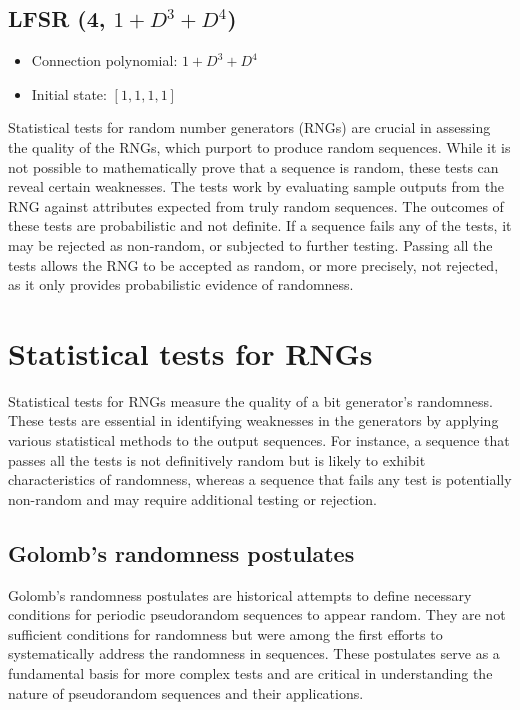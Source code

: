 \documentclass[12pt,openany]{book}
\theoremstyle{definition}
\begin{document}
\subsection*{LFSR (4, \( 1 + D^3 + D^4 \))}
\begin{itemize}
	\item Connection polynomial: \( 1 + D^3 + D^4 \)
	\item Initial state: \( [1, 1, 1, 1] \)
\end{itemize}


\newpage
Statistical tests for random number generators (RNGs) are crucial in assessing the quality of the RNGs, which purport to produce random sequences. While it is not possible to mathematically prove that a sequence is random, these tests can reveal certain weaknesses. The tests work by evaluating sample outputs from the RNG against attributes expected from truly random sequences. The outcomes of these tests are probabilistic and not definite. If a sequence fails any of the tests, it may be rejected as non-random, or subjected to further testing. Passing all the tests allows the RNG to be accepted as random, or more precisely, not rejected, as it only provides probabilistic evidence of randomness.

\section{Statistical tests for RNGs}
Statistical tests for RNGs measure the quality of a bit generator's randomness. These tests are essential in identifying weaknesses in the generators by applying various statistical methods to the output sequences. For instance, a sequence that passes all the tests is not definitively random but is likely to exhibit characteristics of randomness, whereas a sequence that fails any test is potentially non-random and may require additional testing or rejection.

\newpage
\subsection{Golomb’s randomness postulates}
Golomb’s randomness postulates are historical attempts to define necessary conditions for periodic pseudorandom sequences to appear random. They are not sufficient conditions for randomness but were among the first efforts to systematically address the randomness in sequences. These postulates serve as a fundamental basis for more complex tests and are critical in understanding the nature of pseudorandom sequences and their applications.
\end{document}
